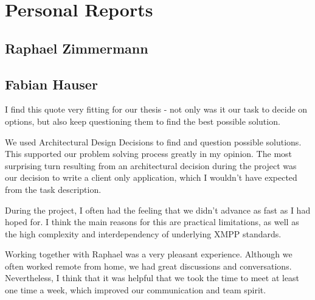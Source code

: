 \section{Personal Reports}\label{sec:personal-reports}

\subsection{Raphael Zimmermann}

\subsection{Fabian Hauser}

%
I find this quote very fitting for our thesis - not only was it our task to decide on options,
but also keep questioning them to find the best possible solution.

We used Architectural Design Decisions to find and question possible solutions.
This supported our problem solving process greatly in my opinion.
The most surprising turn resulting from an architectural decision during the project was our decision to write a client only application,
which I wouldn't have expected from the task description.

During the project, I often had the feeling that we didn't advance as fast as I had hoped for.
I think the main reasons for this are practical limitations, as well as the high complexity and interdependency of underlying XMPP standards.

Working together with Raphael was a very pleasant experience.
Although we often worked remote from home, we had great discussions and conversations.
Nevertheless, I think that it was helpful that we took the time to meet at least one time a week, which improved our communication and team spirit.